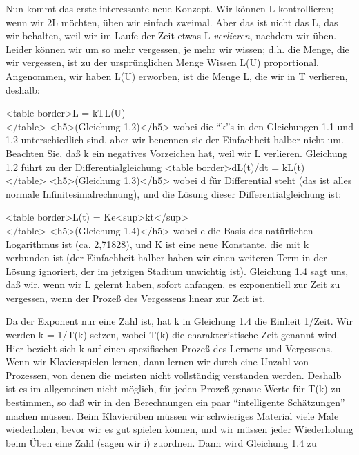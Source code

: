 Nun kommt das erste interessante neue Konzept.
Wir können L kontrollieren; wenn wir 2L möchten, üben wir einfach zweimal.
Aber das ist nicht das L, das wir behalten, weil wir im Laufe der Zeit etwas L \textit{verlieren}, nachdem wir üben.
Leider können wir um so mehr vergessen, je mehr wir wissen; d.h. die Menge, die wir vergessen, ist zu der ursprünglichen Menge Wissen L(U) proportional.
Angenommen, wir haben L(U) erworben, ist die Menge L, die wir in T verlieren, deshalb:

<table border>L = \-kTL(U) \\ </table>
<h5>(Gleichung 1.2)</h5>
wobei die \enquote{k}s in den Gleichungen 1.1 und 1.2 unterschiedlich sind, aber wir benennen sie der Einfachheit halber nicht um.
Beachten Sie, daß k ein negatives Vorzeichen hat, weil wir L verlieren.
Gleichung 1.2 führt zu der Differentialgleichung
<table border>dL(t)/dt = \-kL(t) \\ </table>
<h5>(Gleichung 1.3)</h5>
wobei d für Differential steht (das ist alles normale Infinitesimalrechnung), und die Lösung dieser Differentialgleichung ist:

<table border>L(t) = Ke<sup>\-kt</sup> \\ </table>
<h5>(Gleichung 1.4)</h5>
wobei e die Basis des natürlichen Logarithmus ist (ca. 2,71828), und K ist eine neue Konstante, die mit k verbunden ist (der Einfachheit halber haben wir einen weiteren Term in der Lösung ignoriert, der im jetzigen Stadium unwichtig ist).
Gleichung 1.4 sagt uns, daß wir, wenn wir L gelernt haben, sofort anfangen, es exponentiell zur Zeit zu vergessen, wenn der Prozeß des Vergessens linear zur Zeit ist.

Da der Exponent nur eine Zahl ist, hat k in Gleichung 1.4 die Einheit 1/Zeit.
Wir werden k = 1/T(k) setzen, wobei T(k) die charakteristische Zeit genannt wird.
Hier bezieht sich k auf einen spezifischen Prozeß des Lernens und Vergessens.
Wenn wir Klavierspielen lernen, dann lernen wir durch eine Unzahl von Prozessen, von denen die meisten nicht vollständig verstanden werden.
Deshalb ist es im allgemeinen nicht möglich, für jeden Prozeß genaue Werte für T(k) zu bestimmen, so daß wir in den Berechnungen ein paar \enquote{intelligente Schätzungen} machen müssen.
Beim Klavierüben müssen wir schwieriges Material viele Male wiederholen, bevor wir es gut spielen können, und wir müssen jeder Wiederholung beim Üben eine Zahl (sagen wir i) zuordnen.
Dann wird Gleichung 1.4 zu

